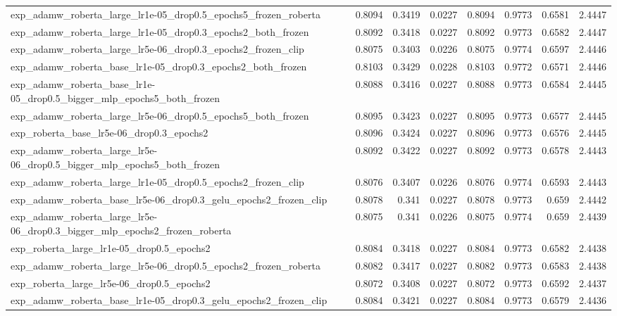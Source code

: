 \documentclass[a4paper,oneside,bibliography=totoc]{scrbook}
\begin{document}
\begin{landscape}
\begin{center}
\begin{longtable}{p{4cm} *{7}{r}}
        exp\_adamw\_roberta\_large\_lr1e-05\_drop0.5\_epochs5\_frozen\_roberta & 0.8094 & 0.3419 & 0.0227 & 0.8094 & 0.9773 & 0.6581 & 2.4447 \\ 
        exp\_adamw\_roberta\_large\_lr1e-05\_drop0.3\_epochs2\_both\_frozen & 0.8092 & 0.3418 & 0.0227 & 0.8092 & 0.9773 & 0.6582 & 2.4447 \\ 
        exp\_adamw\_roberta\_large\_lr5e-06\_drop0.3\_epochs2\_frozen\_clip & 0.8075 & 0.3403 & 0.0226 & 0.8075 & 0.9774 & 0.6597 & 2.4446 \\ 
        exp\_adamw\_roberta\_base\_lr1e-05\_drop0.3\_epochs2\_both\_frozen & 0.8103 & 0.3429 & 0.0228 & 0.8103 & 0.9772 & 0.6571 & 2.4446 \\ 
        exp\_adamw\_roberta\_base\_lr1e-05\_drop0.5\_bigger\_mlp\_epochs5\_both\_frozen & 0.8088 & 0.3416 & 0.0227 & 0.8088 & 0.9773 & 0.6584 & 2.4445 \\ 
        exp\_adamw\_roberta\_large\_lr5e-06\_drop0.5\_epochs5\_both\_frozen & 0.8095 & 0.3423 & 0.0227 & 0.8095 & 0.9773 & 0.6577 & 2.4445 \\ 
        exp\_roberta\_base\_lr5e-06\_drop0.3\_epochs2 & 0.8096 & 0.3424 & 0.0227 & 0.8096 & 0.9773 & 0.6576 & 2.4445 \\ 
        exp\_adamw\_roberta\_large\_lr5e-06\_drop0.5\_bigger\_mlp\_epochs5\_both\_frozen & 0.8092 & 0.3422 & 0.0227 & 0.8092 & 0.9773 & 0.6578 & 2.4443 \\ 
        exp\_adamw\_roberta\_large\_lr1e-05\_drop0.5\_epochs2\_frozen\_clip & 0.8076 & 0.3407 & 0.0226 & 0.8076 & 0.9774 & 0.6593 & 2.4443 \\ 
        exp\_adamw\_roberta\_base\_lr5e-06\_drop0.3\_gelu\_epochs2\_frozen\_clip & 0.8078 & 0.341 & 0.0227 & 0.8078 & 0.9773 & 0.659 & 2.4442 \\ 
        exp\_adamw\_roberta\_large\_lr5e-06\_drop0.3\_bigger\_mlp\_epochs2\_frozen\_roberta & 0.8075 & 0.341 & 0.0226 & 0.8075 & 0.9774 & 0.659 & 2.4439 \\ 
        exp\_roberta\_large\_lr1e-05\_drop0.5\_epochs2 & 0.8084 & 0.3418 & 0.0227 & 0.8084 & 0.9773 & 0.6582 & 2.4438 \\ 
        exp\_adamw\_roberta\_large\_lr5e-06\_drop0.5\_epochs2\_frozen\_roberta & 0.8082 & 0.3417 & 0.0227 & 0.8082 & 0.9773 & 0.6583 & 2.4438 \\ 
        exp\_roberta\_large\_lr5e-06\_drop0.5\_epochs2 & 0.8072 & 0.3408 & 0.0227 & 0.8072 & 0.9773 & 0.6592 & 2.4437 \\ 
        exp\_adamw\_roberta\_base\_lr1e-05\_drop0.3\_gelu\_epochs2\_frozen\_clip & 0.8084 & 0.3421 & 0.0227 & 0.8084 & 0.9773 & 0.6579 & 2.4436 \\ 

\end{longtable}
\end{center}
\end{landscape}
\end{document}
